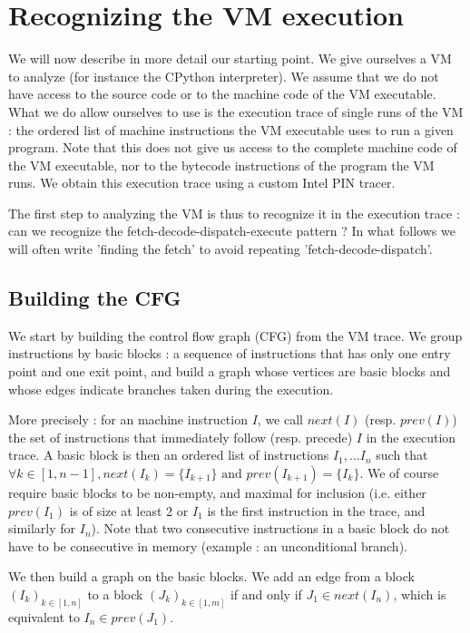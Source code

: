 \documentclass[french]{article}
\begin{document}
\section{Recognizing the VM execution}

We will now describe in more detail our starting point. We give ourselves a VM to analyze (for instance the CPython interpreter). We assume that we do not have access to the source code or to the machine code of the VM executable. What we do allow ourselves to use is the execution trace of single runs of the VM : the ordered list of machine instructions the VM executable uses to run a given program. Note that this does not give us access to the complete machine code of the VM executable, nor to the bytecode instructions of the program the VM runs. We obtain this execution trace using a custom Intel PIN tracer.

The first step to analyzing the VM is thus to recognize it in the execution trace : can we recognize the fetch-decode-dispatch-execute pattern ? In what follows we will often write 'finding the fetch' to avoid repeating 'fetch-decode-dispatch'.

\subsection{Building the CFG}

We start by building the control flow graph (CFG) from the VM trace. We group instructions by basic blocks : a sequence of instructions that has only one entry point and one exit point, and build a graph whose vertices are basic blocks and whose edges indicate branches taken during the execution.

More precisely : for an machine instruction $I$, we call $next(I)$ (resp. $prev(I)$) the set of instructions that immediately follow (resp. precede) $I$ in the execution trace. A basic block is then an ordered list of instructions $I_1, \dots I_n$ such that $\forall k \in [1, n-1], next(I_k) = \{I_{k+1}\} \textrm{ and } prev(I_{k+1}) = \{I_k\}$. We of course require basic blocks to be non-empty, and maximal for inclusion (i.e. either $prev(I_1)$ is of size at least 2 or $I_1$ is the first instruction in the trace, and similarly for $I_n$). Note that two consecutive instructions in a basic block do not have to be consecutive in memory (example : an unconditional branch).

We then build a graph on the basic blocks. We add an edge from a block $(I_k)_{k \in [1,n]}$ to a block $(J_k)_{k \in [1, m]}$ if and only if $J_1 \in next(I_n)$, which is equivalent to $I_n \in prev(J_1)$.
\end{document}
